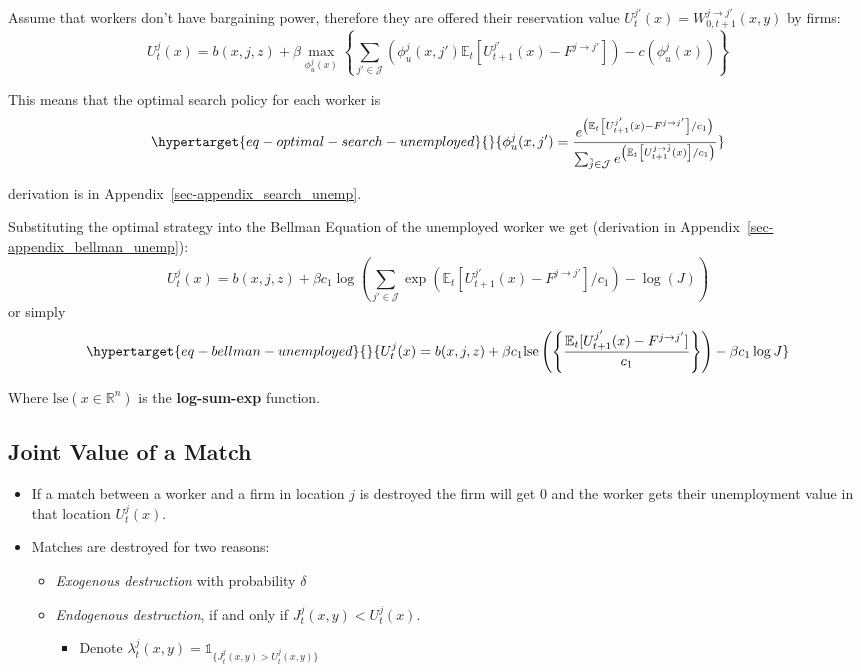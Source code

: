 \documentclass[
  letterpaper,
  DIV=11,
  numbers=noendperiod]{scrreprt}
\providecommand{\tightlist}{%
  \setlength{\itemsep}{0pt}\setlength{\parskip}{0pt}}\usepackage{longtable,booktabs,array}
\begin{document}
Assume that workers don't have bargaining power, therefore they are
offered their reservation value
\(U^{j'}_t(x)=W^{j\to j'}_{0, t+1}(x,y)\) by firms:
\[U^{j}_{t}(x) = b(x, j, z) + \beta \max_{\phi^j_u(x)} \left\{\sum_{j'\in \mathcal{J}} \left(\phi^j_u(x, j')\mathbb{E}_t\left[U^{j'}_{t+1}(x) - F^{j \to j'}\right]\right) -c(\phi^j_u(x)) \right\} \]

This means that the optimal search policy for each worker is
\begin{equation}\protect\hypertarget{eq-optimal-search-unemployed}{}{ \phi^j_u(x,j') = \frac{e^{\left(\mathbb{E}_t\left[U^{j'}_{t+1}(x) - F^{j \to j'}\right] /c_1\right)}}{\sum_{\tilde{j}\in \mathcal{J}}e^{\left(\mathbb{E}_t\left[U^{j \to \tilde{j}}_{t+1}(x)\right] /c_1\right)}}}\label{eq-optimal-search-unemployed}\end{equation}

derivation is in Appendix~\ref{sec-appendix_search_unemp}.

Substituting the optimal strategy into the Bellman Equation of the
unemployed worker we get (derivation in
Appendix~\ref{sec-appendix_bellman_unemp}):
\[U^{j}_{t}(x) = b(x, j, z) + \beta c_1 \log{\left( \sum_{j' \in \mathcal{J}}\exp{\left(\mathbb{E}_t[U_{t+1}^{j'}(x) - F^{j \to j'}]/c_1\right)}-\log{(J)}\right)}\]
or simply
\begin{equation}\protect\hypertarget{eq-bellman-unemployed}{}{U^{j}_{t}(x)=b(x,j,z)+\beta c_{1}\text{lse}\left(\left\{\frac{\mathbb{E}_{t}[U^{j'}_{t+1}(x)-F^{j\to j'}]}{c_{1}}\right\}\right) - \beta c_{1}\log{J}}\label{eq-bellman-unemployed}\end{equation}

Where \(\text{lse}(x\in \mathbb{R}^n)\) is the \textbf{log-sum-exp}
function.

\hypertarget{joint-value-of-a-match}{%
\subsection{Joint Value of a Match}\label{joint-value-of-a-match}}

\begin{itemize}
\tightlist
\item
  If a match between a worker and a firm in location \(j\) is destroyed
  the firm will get \(0\) and the worker gets their unemployment value
  in that location \(U^j_t(x)\).
\item
  Matches are destroyed for two reasons:

  \begin{itemize}
  \tightlist
  \item
    \emph{Exogenous destruction} with probability \(\delta\)
  \item
    \emph{Endogenous destruction}, if and only if
    \(J^j_t(x,y) < U^j_t(x)\).

    \begin{itemize}
    \tightlist
    \item
      Denote
      \(\lambda^j_{t}(x,y) = \mathbb{1}_{\{J^j_{t}(x,y)>U^j_{t}(x,y)\}}\)
    \end{itemize}
  \end{itemize}
\end{itemize}
\end{document}
